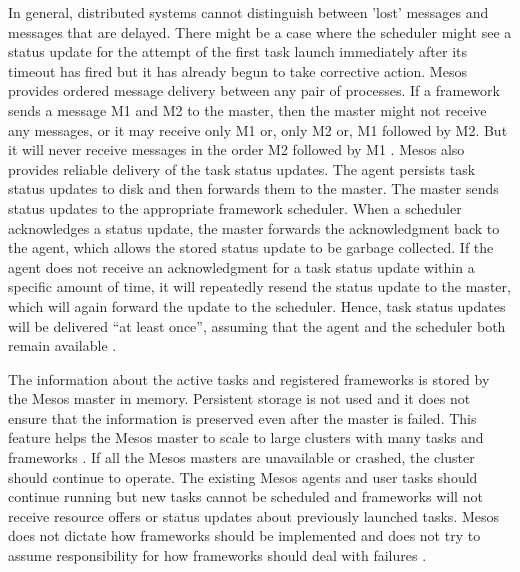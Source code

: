 \documentclass[9pt,twocolumn,twoside]{../../styles/osajnl}
\begin{document}
In general, distributed systems cannot distinguish between 'lost'
messages and messages that are delayed. There might be a case where
the scheduler might see a status update for the attempt of the first
task launch immediately after its timeout has fired but it has already
begun to take corrective action.  Mesos provides ordered message
delivery between any pair of processes. If a framework sends a message
M1 and M2 to the master, then the master might not receive any
messages, or it may receive only M1 or, only M2 or, M1 followed by
M2. But it will never receive messages in the order M2 followed by M1
\cite{www-mesos-frmwrk}.  Mesos also provides reliable delivery of the
task status updates.  The agent persists task status updates to disk
and then forwards them to the master.  The master sends status updates
to the appropriate framework scheduler.  When a scheduler acknowledges
a status update, the master forwards the acknowledgment back to the
agent, which allows the stored status update to be garbage
collected. If the agent does not receive an acknowledgment for a task
status update within a specific amount of time, it will repeatedly
resend the status update to the master, which will again forward the
update to the scheduler. Hence, task status updates will be delivered
``at least once'', assuming that the agent and the scheduler both
remain available \cite{www-mesos-frmwrk}.

The information about the active tasks and registered frameworks is
stored by the Mesos master in memory.  Persistent storage is not used
and it does not ensure that the information is preserved even after
the master is failed.  This feature helps the Mesos master to scale to
large clusters with many tasks and frameworks \cite{www-mesos-frmwrk}.
If all the Mesos masters are unavailable or crashed, the cluster
should continue to operate.  The existing Mesos agents and user tasks
should continue running but new tasks cannot be scheduled and
frameworks will not receive resource offers or status updates about
previously launched tasks. Mesos does not dictate how frameworks
should be implemented and does not try to assume responsibility for
how frameworks should deal with failures \cite{www-mesos-frmwrk}.
\end{document}
